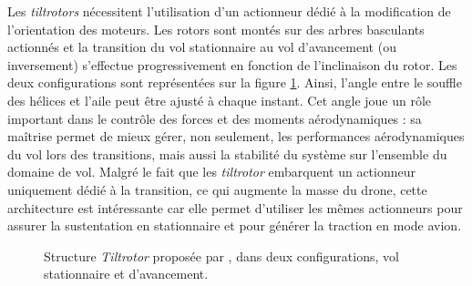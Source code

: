         Les \textit{tiltrotors} nécessitent l'utilisation d'un actionneur dédié à la modification de l'orientation des moteurs. Les rotors sont montés sur des arbres basculants actionnés et la transition du vol stationnaire au vol d'avancement (ou inversement) s'effectue progressivement en fonction de l'inclinaison du rotor. Les deux configurations sont représentées sur la figure \ref{fig:tiltrotor}. Ainsi, l'angle entre le souffle des hélices et l'aile peut être ajusté à chaque instant. Cet angle joue un rôle important dans le contrôle des forces et des moments aérodynamiques : sa maîtrise permet de mieux gérer, non seulement, les performances aérodynamiques du vol lors des transitions, mais aussi la stabilité du système sur l'ensemble du domaine de vol. 
        Malgré le fait que les \textit{tiltrotor} embarquent un actionneur uniquement dédié à la transition, ce qui augmente la masse du drone, cette architecture est intéressante car elle permet d'utiliser les mêmes actionneurs pour assurer la sustentation en stationnaire et pour générer la traction en mode avion.
        \begin{figure}[ht!]
            \centering
            \caption{Structure \textit{Tiltrotor}  proposée par \cite{7040348}, dans deux configurations, vol stationnaire et d'avancement.}
            \label{fig:tiltrotor}
        \end{figure}


        

